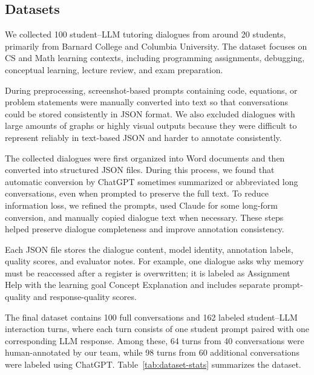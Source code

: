 \subsection{Datasets}

We collected 100 student--LLM tutoring dialogues from around 20 students, primarily from Barnard College and Columbia University. The dataset focuses on CS and Math learning contexts, including programming assignments, debugging, conceptual learning, lecture review, and exam preparation.

During preprocessing, screenshot-based prompts containing code, equations, or problem statements were manually converted into text so that conversations could be stored consistently in JSON format. We also excluded dialogues with large amounts of graphs or highly visual outputs because they were difficult to represent reliably in text-based JSON and harder to annotate consistently.

The collected dialogues were first organized into Word documents and then converted into structured JSON files. During this process, we found that automatic conversion by ChatGPT sometimes summarized or abbreviated long conversations, even when prompted to preserve the full text. To reduce information loss, we refined the prompts, used Claude for some long-form conversion, and manually copied dialogue text when necessary. These steps helped preserve dialogue completeness and improve annotation consistency.

Each JSON file stores the dialogue content, model identity, annotation labels, quality scores, and evaluator notes. For example, one dialogue asks why memory must be reaccessed after a register is overwritten; it is labeled as Assignment Help with the learning goal Concept Explanation and includes separate prompt-quality and response-quality scores.

The final dataset contains 100 full conversations and 162 labeled student--LLM interaction turns, where each turn consists of one student prompt paired with one corresponding LLM response. Among these, 64 turns from 40 conversations were human-annotated by our team, while 98 turns from 60 additional conversations were labeled using ChatGPT. Table~\ref{tab:dataset-stats} summarizes the dataset.

